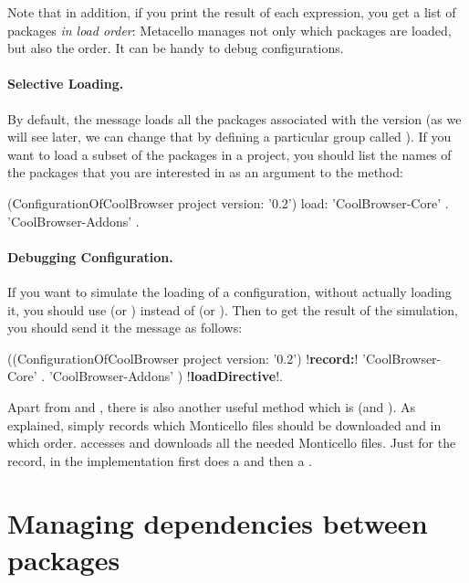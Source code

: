 \documentclass[a4paper,10pt,twoside]{book}
\begin{document}
Note that in addition, if you print the result of each expression, you get a list of packages \emph{in load order}: Metacello manages not only which packages are loaded, but also the order. It can be handy to debug configurations.

\paragraph{Selective Loading.} By default, the  message loads all the packages associated with the version (as we will see later, we can change that by defining a particular group called ). If you want to load a subset of the packages in a project, you should list
the names of the packages that you are interested in as an argument to the  method:

\begin{code}{}
  (ConfigurationOfCoolBrowser project version: '0.2') load:
  		{ 'CoolBrowser-Core' .
  		'CoolBrowser-Addons' }.
\end{code}


\paragraph{Debugging Configuration.}
If you want to simulate the loading of a configuration, without actually loading it, you should use  (or ) instead of  (or ). Then to get the result of the simulation, you should send it the message  as follows:

\begin{code}{}
  ((ConfigurationOfCoolBrowser project version: '0.2') !\textbf{record:}!
  		{ 'CoolBrowser-Core' .
		'CoolBrowser-Addons' }) !\textbf{loadDirective}!.
\end{code}

Apart from  and , there is also another useful method  which is  (and ). As explained,  simply records which Monticello files should be downloaded and in which order.   accesses and downloads all the needed Monticello files. Just for the record, in the implementation  first does a  and then a .

\section{Managing dependencies between packages}
\end{document}
